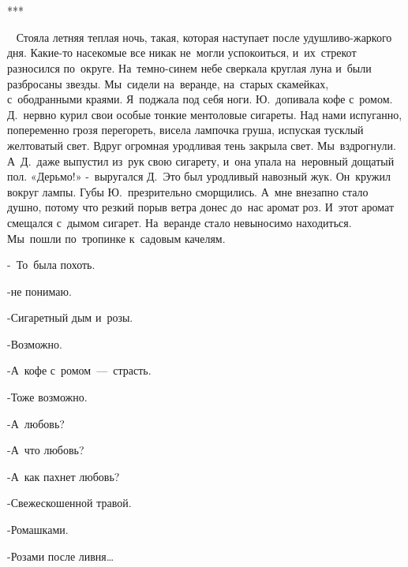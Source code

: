 ~
~~~~~~~~~~~~~~~~~~~~~~~~~~~~~~~~~~~~~~~~~~~~~~~~~~~~~~~~~~~~~~~~~~~~~~~~***
 

~
Стояла летняя теплая ночь, такая, которая наступает после удушливо-жаркого дня.
Какие-то насекомые все никак не~могли успокоиться, и~их~стрекот разносился по~округе.
На~темно-синем небе сверкала круглая луна и~были разбросаны звезды.
Мы~сидели на~веранде, на~старых скамейках, с~ободранными краями.
Я~поджала под себя ноги.
Ю.~допивала кофе с~ромом.
Д.~нервно курил свои особые тонкие ментоловые сигареты.
Над нами испуганно, попеременно грозя перегореть, висела лампочка груша, испуская тусклый желтоватый свет.
Вдруг огромная уродливая тень закрыла свет.
Мы~вздрогнули.
А~Д.~даже выпустил из~рук свою сигарету, и~она упала на~неровный дощатый пол.
«Дерьмо!» -~выругался Д.~Это был уродливый навозный жук.
Он~кружил вокруг лампы.
Губы Ю.~презрительно сморщились.
А~мне внезапно стало душно, потому что резкий порыв ветра донес до~нас аромат роз.
И~этот аромат смещался с~дымом сигарет.
На~веранде стало невыносимо находиться.
Мы~пошли по~тропинке к~садовым качелям.
 
-~То~была похоть.
 
-не понимаю.
 
-Сигаретный дым и~розы.
 
-Возможно.
 
-А~кофе с~ромом~---~страсть.
 
-Тоже возможно.
 
-А~любовь?
 
-А~что любовь?
 
-А~как пахнет любовь?
 
-Свежескошенной травой.
 
-Ромашками.
 
-Розами после ливня… 
